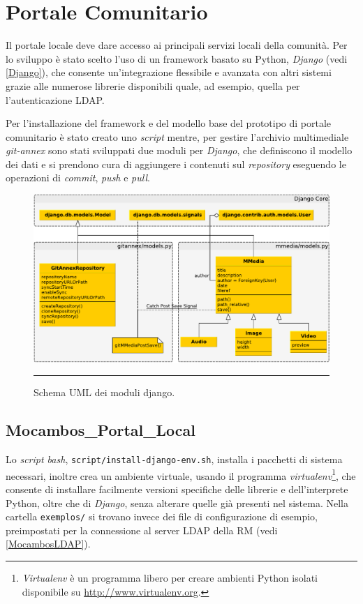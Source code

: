 \section{Portale Comunitario}
Il portale locale deve dare accesso ai principali servizi locali della
comunità. Per lo sviluppo è stato scelto l'uso di un framework basato
su Python, \emph{Django} (vedi \ref{Django}), che consente
un'integrazione flessibile e avanzata con altri sistemi grazie alle
numerose librerie disponibili quale, ad esempio, quella per
l'autenticazione LDAP.

Per l'installazione del framework e del modello base del prototipo di
portale comunitario è stato creato uno \emph{script} mentre, per
gestire l'archivio multimediale \emph{git-annex} sono stati sviluppati
due moduli per \emph{Django}, che definiscono il modello dei dati e si
prendono cura di aggiungere i contenuti sul \emph{repository}
eseguendo le operazioni di \emph{commit}, \emph{push} e \emph{pull}.

\begin{figure}[htbp]
  \centering
  \includegraphics[width=\textwidth]{./Figure/UML_Schema_Django-crop.pdf}
  \rule{35em}{0.5pt}
  \caption[Schema UML dei moduli django]{Schema UML dei moduli django.}
  \label{fig:SchemaUMLDjango}
\end{figure}

\subsection{Mocambos\_Portal\_Local}

Lo \emph{script bash}, \verb|script/install-django-env.sh|, installa i
pacchetti di sistema necessari, inoltre crea un ambiente virtuale,
usando il programma \emph{virtualenv}\footnote{\emph{Virtualenv} è un
  programma libero per creare ambienti Python isolati disponibile su
  \url{http://www.virtualenv.org}.}, che consente di installare
facilmente versioni specifiche delle librerie e dell'interprete
Python, oltre che di \emph{Django}, senza alterare quelle già presenti
nel sistema. Nella cartella \verb|exemplos/| si trovano invece dei
file di configurazione di esempio, preimpostati per la connessione al
server LDAP della RM (vedi \ref{MocambosLDAP}).


